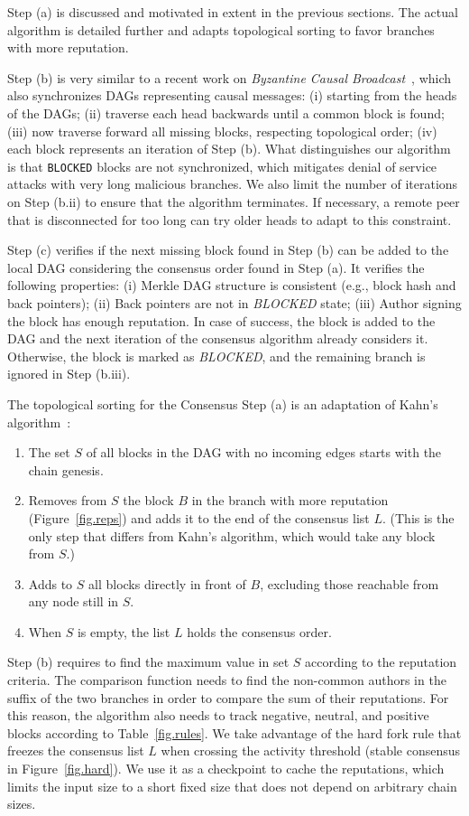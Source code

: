 \documentclass[12pt]{article}
\newcommand{\code}[1]  {\texttt{\footnotesize{#1}}}
\begin{document}
Step (a) is discussed and motivated in extent in the previous sections.
The actual algorithm is detailed further and adapts topological sorting to
favor branches with more reputation.

Step (b) is very similar to a recent work on \emph{Byzantine Causal
Broadcast}~\cite{p2p.dag.sync}, which also synchronizes DAGs representing
causal messages:
    (i)   starting from the heads of the DAGs;
    (ii)  traverse each head backwards until a common block is found;
    (iii) now traverse forward all missing blocks, respecting topological order;
    (iv)  each block represents an iteration of Step (b).
What distinguishes our algorithm is that \code{BLOCKED} blocks are not
synchronized, which mitigates denial of service attacks with very long
malicious branches.
We also limit the number of iterations on Step (b.ii) to ensure that the
algorithm terminates.
If necessary, a remote peer that is disconnected for too long can try older
heads to adapt to this constraint.

Step (c) verifies if the next missing block found in Step (b) can be added to
the local DAG considering the consensus order found in Step (a).
It verifies the following properties:
    (i)   Merkle DAG structure is consistent (e.g., block hash and back pointers);
    (ii)  Back pointers are not in \emph{BLOCKED} state;
    (iii) Author signing the block has enough reputation.
In case of success, the block is added to the DAG and the next iteration of the
consensus algorithm already considers it.
Otherwise, the block is marked as \emph{BLOCKED}, and the remaining branch is
ignored in Step (b.iii).

The topological sorting for the Consensus Step (a) is an adaptation of Kahn's
algorithm~\cite{kahn}:
%
\begin{enumerate}
\item The set $S$ of all blocks in the DAG with no incoming edges starts with
      the chain genesis.
\item Removes from $S$ the block $B$ in the branch with more reputation
      (Figure~\ref{fig.reps}) and adds it to the end of the consensus list $L$.
      (This is the only step that differs from Kahn's algorithm, which would
      take any block from $S$.)
\item Adds to $S$ all blocks directly in front of $B$, excluding those
      reachable from any node still in $S$.
\item When $S$ is empty, the list $L$ holds the consensus order.
\end{enumerate}
%
Step (b) requires to find the maximum value in set $S$ according to the
reputation criteria.
The comparison function needs to find the non-common authors in the suffix of
the two branches in order to compare the sum of their reputations.
%
For this reason, the algorithm also needs to track negative, neutral, and
positive blocks according to Table~\ref{fig.rules}.
%
We take advantage of the hard fork rule that freezes the consensus list $L$
when crossing the activity threshold (stable consensus in Figure~\ref{fig.hard}).
We use it as a checkpoint to cache the reputations, which limits the input size
to a short fixed size that does not depend on arbitrary chain sizes.
\end{document}
